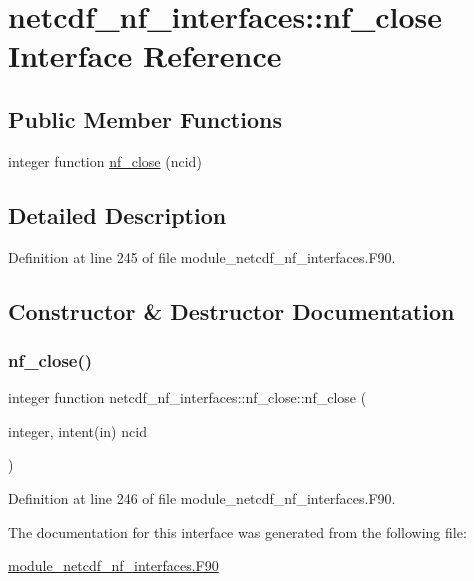 \hypertarget{interfacenetcdf__nf__interfaces_1_1nf__close}{}\section{netcdf\+\_\+nf\+\_\+interfaces\+:\+:nf\+\_\+close Interface Reference}
\label{interfacenetcdf__nf__interfaces_1_1nf__close}
\subsection*{Public Member Functions}
\begin{DoxyCompactItemize}
\item 
integer function \hyperlink{interfacenetcdf__nf__interfaces_1_1nf__close_aee650896fd193da65b0734d7e5474603}{nf\+\_\+close} (ncid)
\end{DoxyCompactItemize}


\subsection{Detailed Description}


Definition at line 245 of file module\+\_\+netcdf\+\_\+nf\+\_\+interfaces.\+F90.



\subsection{Constructor \& Destructor Documentation}
\mbox{\label{interfacenetcdf__nf__interfaces_1_1nf__close_aee650896fd193da65b0734d7e5474603}} 
\subsubsection{\texorpdfstring{nf\+\_\+close()}{nf\_close()}}
{\footnotesize\ttfamily integer function netcdf\+\_\+nf\+\_\+interfaces\+::nf\+\_\+close\+::nf\+\_\+close (\begin{DoxyParamCaption}\item[{integer, intent(in)}]{ncid }\end{DoxyParamCaption})}



Definition at line 246 of file module\+\_\+netcdf\+\_\+nf\+\_\+interfaces.\+F90.



The documentation for this interface was generated from the following file\+:\begin{DoxyCompactItemize}
\item 
\hyperlink{module__netcdf__nf__interfaces_8F90}{module\+\_\+netcdf\+\_\+nf\+\_\+interfaces.\+F90}\end{DoxyCompactItemize}
